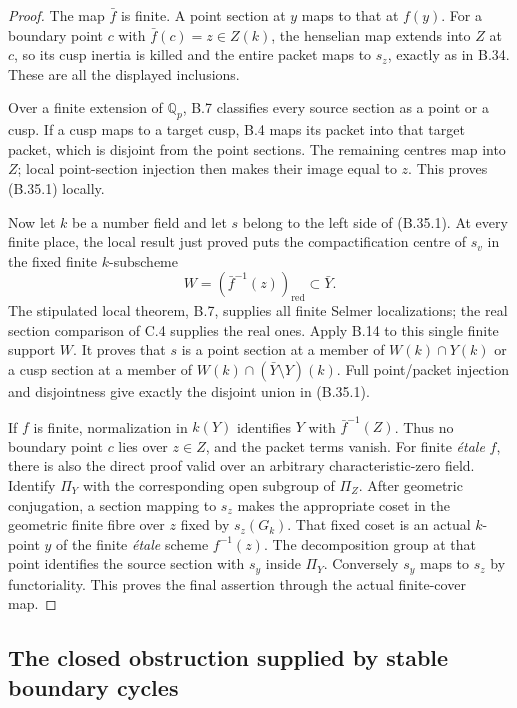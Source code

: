 \begin{proof}
The map $\bar f$ is finite. A point section at $y$ maps
to that at $f(y)$. For a boundary point $c$ with
$\bar f(c)=z\in Z(k)$, the henselian map extends into
$Z$ at $c$, so its cusp inertia is killed and the
entire packet maps to $s_z$, exactly as in B.34.
These are all the displayed inclusions.

Over a finite extension of $\mathbb Q_p$, B.7 classifies
every source section as a point or a cusp. If a cusp
maps to a target cusp, B.4 maps its packet into that
target packet, which is disjoint from the point
sections. The remaining centres map into $Z$; local
point-section injection then makes their image equal
to $z$. This proves (B.35.1) locally.

Now let $k$ be a number field and let $s$ belong to
the left side of (B.35.1). At every finite place,
the local result just proved puts the compactification
centre of $s_v$ in the fixed finite $k$-subscheme
\[
 W=(\bar f^{-1}(z))_{\mathrm{red}}\subset\bar Y.
\]
The stipulated local theorem, B.7, supplies all finite
Selmer localizations; the real section comparison
of C.4 supplies the real ones. Apply B.14 to this
single finite support $W$. It proves that $s$ is a
point section at a member of $W(k)\cap Y(k)$ or a
cusp section at a member of
$W(k)\cap(\bar Y\setminus Y)(k)$.
Full point/packet injection and disjointness give
exactly the disjoint union in (B.35.1).

If $f$ is finite, normalization in $k(Y)$ identifies
$Y$ with $\bar f^{-1}(Z)$. Thus no boundary point
$c$ lies over $z\in Z$, and the packet terms vanish.
For finite \emph{\'etale} $f$, there is also the direct
proof valid over an arbitrary characteristic-zero
field. Identify $\Pi_Y$ with the corresponding open
subgroup of $\Pi_Z$. After geometric conjugation,
a section mapping to $s_z$ makes the appropriate
coset in the geometric finite fibre over $z$ fixed
by $s_z(G_k)$. That fixed coset is an actual
$k$-point $y$ of the finite \emph{\'etale} scheme
$f^{-1}(z)$. The decomposition group at that point
identifies the source section with $s_y$ inside
$\Pi_Y$. Conversely $s_y$ maps to $s_z$ by
functoriality. This proves the final assertion
through the actual finite-cover map.
\end{proof}

\subsection{The closed obstruction supplied by stable boundary cycles}

